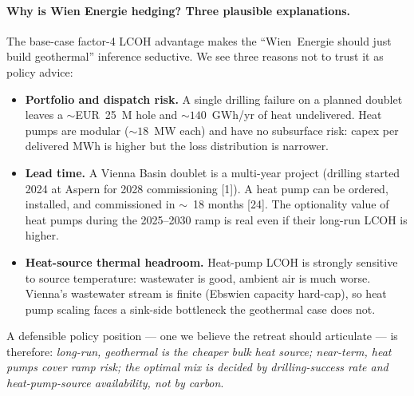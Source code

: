 \documentclass{article}
\begin{document}
\paragraph{Why is Wien Energie hedging? Three plausible explanations.}
The base-case factor-4 LCOH advantage makes the
``Wien~Energie should just build geothermal'' inference seductive.
We see three reasons not to trust it as policy advice:
\begin{itemize}
\item \textbf{Portfolio and dispatch risk.} A single drilling
failure on a planned doublet leaves a $\sim$EUR~25~M hole and
$\sim 140$~GWh/yr of heat undelivered. Heat pumps are modular
($\sim 18$~MW each) and have no subsurface risk: capex per
delivered MWh is higher but the loss distribution is
narrower.
\item \textbf{Lead time.} A Vienna Basin doublet is a multi-year
project (drilling started 2024 at Aspern for 2028 commissioning
[1]). A heat pump can be ordered, installed, and commissioned in
$\sim$~18 months [24]. The optionality value of heat pumps
during the 2025--2030 ramp is real even if their long-run LCOH
is higher.
\item \textbf{Heat-source thermal headroom.} Heat-pump LCOH is
strongly sensitive to source temperature: wastewater is good,
ambient air is much worse. Vienna's wastewater stream is
finite (Ebswien capacity hard-cap), so heat pump scaling
faces a sink-side bottleneck the geothermal case does not.
\end{itemize}
A defensible policy position --- one we believe the retreat
should articulate --- is therefore: \emph{long-run, geothermal is
the cheaper bulk heat source; near-term, heat pumps cover ramp
risk; the optimal mix is decided by drilling-success rate and
heat-pump-source availability, not by carbon}.
\end{document}
